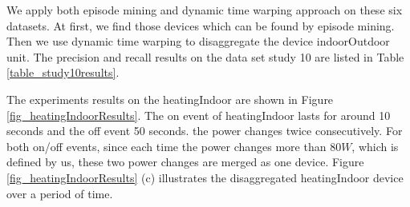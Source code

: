 We apply both episode mining and dynamic time warping approach on these six datasets. 
At first, we find those devices which can be found by episode mining. 
Then we use dynamic time warping to disaggregate the device indoorOutdoor unit. 
The precision and recall results on the data set study 10 are listed in Table \ref{table_study10results}.

The experiments results on the heatingIndoor are shown in Figure \ref{fig_heatingIndoorResults}.
The on event of heatingIndoor lasts for around 10 seconds and the off event 50 seconds. 
the power changes twice consecutively.  
For both on/off events, 
since each time the power changes more than $80W$, which is defined by us, 
these two power changes are merged as one device. 
Figure \ref{fig_heatingIndoorResults} (c) illustrates the disaggregated heatingIndoor device 
over a period of time. 


%
 
%


